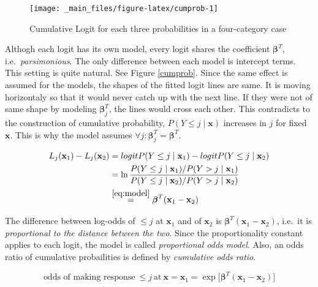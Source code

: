 \documentclass[]{book}
\begin{document}
\begin{figure}[H]

{\centering \texttt{[image: \_main\_files/figure-latex/cumprob-1]} 

}

\caption{Cumulative Logit for each three probabilities in a four-category case\label{cumprob}}\label{fig:cumprob}
\end{figure}

Althogh each logit has its own model, every logit shares the coefficient \(\boldsymbol\beta^T\), i.e.~\emph{parsimonious}. The only difference between each model is intercept terms. This setting is quite natural. See Figure \ref{cumprob}. Since the same effect is assumed for the models, the shapes of the fitted logit lines are same. It is moving horizontaly so that it would never catch up with the next line. If they were not of same shape by modeling \(\boldsymbol\beta_j^T\), the lines would cross each other. This contradicts to the construction of cumulative probability, \(P(Y \le j \mid \mathbf{x})\) increases in \(j\) for fixed \(\mathbf{x}\). This is why the model assumes \(\forall j : \boldsymbol\beta_j^T = \boldsymbol\beta^T\).

\begin{equation}
\begin{split}
L_j(\mathbf{x}_1) - L_j(\mathbf{x}_2) & = logit P(Y \le j \mid \mathbf{x}_1) - logit P(Y \le j \mid \mathbf{x}_2) \\
& = \ln\frac{P(Y \le j \mid \mathbf{x}_1) / P(Y > j \mid \mathbf{x}_1)}{P(Y \le j \mid \mathbf{x}_2) / P(Y > j \mid \mathbf{x}_2)} \\
& \overset{\eqref{eq:model}}{=} \boldsymbol\beta^T(\mathbf{x}_1 - \mathbf{x}_2)
\label{eq:propodds}
\end{split}
\end{equation}

The difference between log-odds of \(\le j\) at \(\mathbf{x}_1\) and of \(\mathbf{x}_2\) is \(\boldsymbol\beta^T(\mathbf{x}_1 - \mathbf{x}_2)\), i.e.~it is \emph{proportional to the distance between the two}. Since the proportionality constant applies to each logit, the model is called \emph{proportional odds model}. Also, an odds ratio of cumulative probailities is defined by \emph{cumulative odds ratio}.

\begin{equation}
\text{odds of making response}\: \le j \:\text{at}\: \mathbf{x} = \mathbf{x}_1 = \exp\big[\boldsymbol\beta^T(\mathbf{x}_1 - \mathbf{x}_2)\big]
\label{eq:oddr}
\end{equation}
\end{document}
